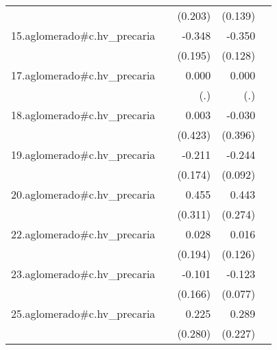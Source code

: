 {\begin{longtable}{l*{4}{D{.}{.}{-1}}}
            &                     &     (0.203)         &     (0.139)         &                     \\
\addlinespace
15.aglomerado#c.hv\_precaria&                     &      -0.348         &      -0.350\sym{**} &                     \\
            &                     &     (0.195)         &     (0.128)         &                     \\
\addlinespace
17.aglomerado#c.hv\_precaria&                     &       0.000         &       0.000         &                     \\
            &                     &         (.)         &         (.)         &                     \\
\addlinespace
18.aglomerado#c.hv\_precaria&                     &       0.003         &      -0.030         &                     \\
            &                     &     (0.423)         &     (0.396)         &                     \\
\addlinespace
19.aglomerado#c.hv\_precaria&                     &      -0.211         &      -0.244\sym{**} &                     \\
            &                     &     (0.174)         &     (0.092)         &                     \\
\addlinespace
20.aglomerado#c.hv\_precaria&                     &       0.455         &       0.443         &                     \\
            &                     &     (0.311)         &     (0.274)         &                     \\
\addlinespace
22.aglomerado#c.hv\_precaria&                     &       0.028         &       0.016         &                     \\
            &                     &     (0.194)         &     (0.126)         &                     \\
\addlinespace
23.aglomerado#c.hv\_precaria&                     &      -0.101         &      -0.123         &                     \\
            &                     &     (0.166)         &     (0.077)         &                     \\
\addlinespace
25.aglomerado#c.hv\_precaria&                     &       0.225         &       0.289         &                     \\
            &                     &     (0.280)         &     (0.227)         &                     \\

\end{longtable}}
